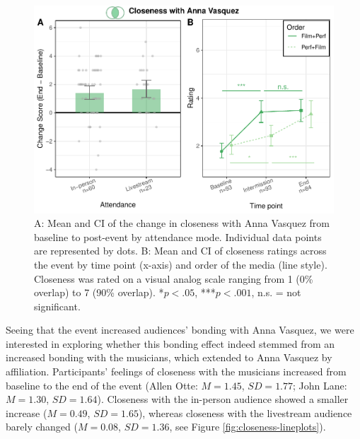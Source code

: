 \documentclass[
  man,floatsintext]{apa6}
\begin{document}
\begin{figure}
\includegraphics[width=1\linewidth]{Schlichting_MSc_Thesis_files/figure-latex/closeness-plots-1} \caption{A: Mean and CI of the change in closeness with Anna Vasquez from baseline to post-event by attendance mode. Individual data points are represented by dots. B: Mean and CI of closeness ratings across the event by time point (x-axis) and order of the media (line style). Closeness was rated on a visual analog scale ranging from 1 (0\% overlap) to 7 (90\% overlap). *\(p < .05\), ***\(p < .001\), n.s. = not significant.}\label{fig:closeness-plots}
\end{figure}

Seeing that the event increased audiences' bonding with Anna Vasquez, we were interested in exploring whether this bonding effect indeed stemmed from an increased bonding with the musicians, which extended to Anna Vasquez by affiliation. Participants' feelings of closeness with the musicians increased from baseline to the end of the event (Allen Otte: \(M = 1.45\), \(SD = 1.77\); John Lane: \(M = 1.30\), \(SD = 1.64\)). Closeness with the in-person audience showed a smaller increase (\(M = 0.49\), \(SD = 1.65\)), whereas closeness with the livestream audience barely changed (\(M = 0.08\), \(SD = 1.36\), see Figure \ref{fig:closeness-lineplots}).
\end{document}
